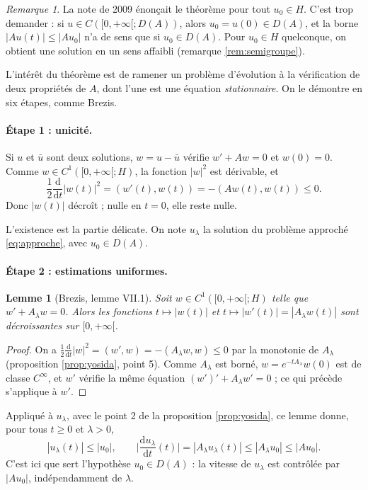 \documentclass[11pt,a4paper]{article}
\theoremstyle{plain}
\newtheorem{lemme}[theoreme]{Lemme}
\theoremstyle{definition}
\theoremstyle{remark}
\newtheorem{remarque}[theoreme]{Remarque}
\newcommand{\dt}{\frac{\mathrm{d}}{\mathrm{d}t}}
\begin{document}
\begin{remarque}
La note de 2009 énonçait le théorème pour tout $u_0\in H$. C'est trop demander : si $u\in C([0,+\infty[;D(A))$, alors $u_0=u(0)\in D(A)$, et la borne $|Au(t)|\leq|Au_0|$ n'a de sens que si $u_0\in D(A)$. Pour $u_0\in H$ quelconque, on obtient une solution en un sens affaibli (remarque \ref{rem:semigroupe}).
\end{remarque}

L'intérêt du théorème est de ramener un problème d'évolution à la vérification de deux propriétés de $A$, dont l'une est une équation \emph{stationnaire}. On le démontre en six étapes, comme Brezis.

\paragraph{Étape 1 : unicité.} Si $u$ et $\bar u$ sont deux solutions, $w=u-\bar u$ vérifie $w'+Aw=0$ et $w(0)=0$. Comme $w\in C^1([0,+\infty[;H)$, la fonction $|w|^2$ est dérivable, et
\[
  \frac12\dt|w(t)|^2=(w'(t),w(t))=-(Aw(t),w(t))\leq0 .
\]
Donc $|w(t)|$ décroît ; nulle en $t=0$, elle reste nulle.

L'existence est la partie délicate. On note $u_\lambda$ la solution du problème approché \eqref{eq:approche}, avec $u_0\in D(A)$.

\paragraph{Étape 2 : estimations uniformes.}

\begin{lemme}[Brezis, lemme VII.1]\label{lem:decroissance}
Soit $w\in C^1([0,+\infty[;H)$ telle que $w'+A_\lambda w=0$. Alors les fonctions $t\mapsto|w(t)|$ et $t\mapsto|w'(t)|=|A_\lambda w(t)|$ sont décroissantes sur $[0,+\infty[$.
\end{lemme}

\begin{proof}
On a $\frac12\dt|w|^2=(w',w)=-(A_\lambda w,w)\leq0$ par la monotonie de $A_\lambda$ (proposition \ref{prop:yosida}, point 5). Comme $A_\lambda$ est borné, $w=e^{-tA_\lambda}w(0)$ est de classe $C^\infty$, et $w'$ vérifie la même équation $(w')'+A_\lambda w'=0$ ; ce qui précède s'applique à $w'$.
\end{proof}

Appliqué à $u_\lambda$, avec le point 2 de la proposition \ref{prop:yosida}, ce lemme donne, pour tous $t\geq0$ et $\lambda>0$,
\begin{equation}\label{eq:estim}
  |u_\lambda(t)|\leq|u_0|,\qquad
  \Big|\frac{\mathrm{d}u_\lambda}{\mathrm{d}t}(t)\Big|=|A_\lambda u_\lambda(t)|\leq|A_\lambda u_0|\leq|Au_0| .
\end{equation}
C'est ici que sert l'hypothèse $u_0\in D(A)$ : la vitesse de $u_\lambda$ est contrôlée par $|Au_0|$, indépendamment de $\lambda$.
\end{document}
